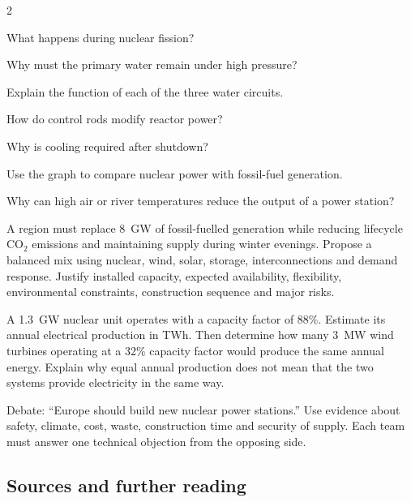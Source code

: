 \begin{multicols}{2}
\begin{questions}
\item What happens during nuclear fission?
\item Why must the primary water remain under high pressure?
\item Explain the function of each of the three water circuits.
\item How do control rods modify reactor power?
\item Why is cooling required after shutdown?
\item Use the graph to compare nuclear power with fossil-fuel generation.
\item Why can high air or river temperatures reduce the output of a power station?
\end{questions}

\begin{challenge}
A region must replace 8~GW of fossil-fuelled generation while reducing lifecycle CO$_2$ emissions and maintaining supply during winter evenings. Propose a balanced mix using nuclear, wind, solar, storage, interconnections and demand response. Justify installed capacity, expected availability, flexibility, environmental constraints, construction sequence and major risks.
\end{challenge}

\begin{applicationexercise}
A 1.3~GW nuclear unit operates with a capacity factor of 88\%. Estimate its annual electrical production in TWh. Then determine how many 3~MW wind turbines operating at a 32\% capacity factor would produce the same annual energy. Explain why equal annual production does not mean that the two systems provide electricity in the same way.
\end{applicationexercise}

\begin{speaking}
Debate: ``Europe should build new nuclear power stations.'' Use evidence about safety, climate, cost, waste, construction time and security of supply. Each team must answer one technical objection from the opposing side.
\end{speaking}

\end{multicols}

\subsection*{Sources and further reading}
\quad
{}\quad
{}
